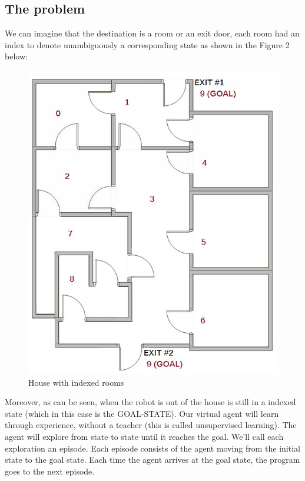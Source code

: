 \documentclass[a4paper]{article}
\begin{document}
\subsection{The problem}
We can imagine that the destination is a room or an exit door, each room had an index to denote unambiguously a corresponding state as shown in the Figure 2 below:
\begin{figure}[htbp]
\begin{center}
\includegraphics[scale=0.5]{problem2.jpg}
\caption{House with indexed rooms}
\end{center}
\end{figure}

Moreover, as can be seen, when the robot is out of the house is still in a indexed state (which in this case is the GOAL-STATE). 
Our virtual agent will learn through experience, without a teacher (this is called unsupervised learning).  The agent will explore from state to state until it reaches the goal. We'll call each exploration an episode.  Each episode consists of the agent moving from the initial state to the goal state.  Each time the agent arrives at the goal state, the program goes to the next episode.
\end{document}
